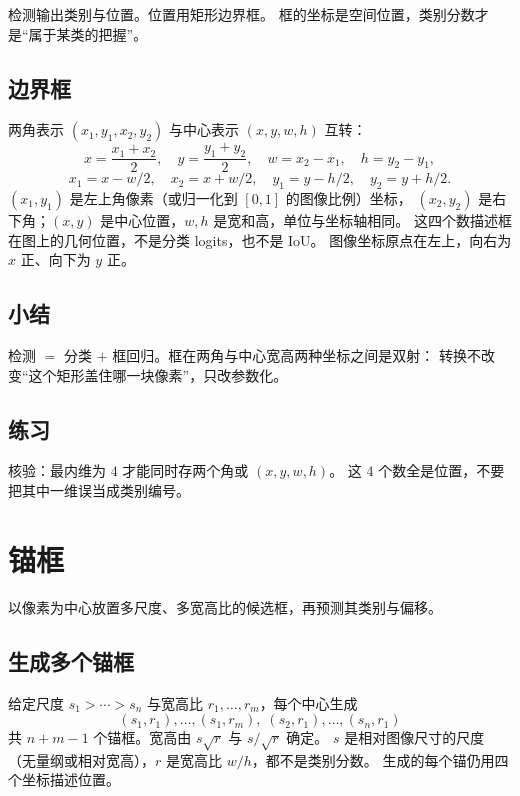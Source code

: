 检测输出类别与位置。位置用矩形边界框。
框的坐标是空间位置，类别分数才是“属于某类的把握”。

\subsection{边界框}

两角表示 $(x_1,y_1,x_2,y_2)$ 与中心表示 $(x,y,w,h)$ 互转：
\[
x=\frac{x_1+x_2}{2},\quad
y=\frac{y_1+y_2}{2},\quad
w=x_2-x_1,\quad
h=y_2-y_1,
\]
\[
x_1=x-w/2,\quad
x_2=x+w/2,\quad
y_1=y-h/2,\quad
y_2=y+h/2.
\]
$(x_1,y_1)$ 是左上角像素（或归一化到 $[0,1]$ 的图像比例）坐标，
$(x_2,y_2)$ 是右下角；$(x,y)$ 是中心位置，$w,h$ 是宽和高，单位与坐标轴相同。
这四个数描述框在图上的几何位置，不是分类 logits，也不是 IoU。
图像坐标原点在左上，向右为 $x$ 正、向下为 $y$ 正。

\subsection{小结}

检测 $=$ 分类 $+$ 框回归。框在两角与中心宽高两种坐标之间是双射：
转换不改变“这个矩形盖住哪一块像素”，只改参数化。

\subsection{练习}

核验：最内维为 $4$ 才能同时存两个角或 $(x,y,w,h)$。
这 $4$ 个数全是位置，不要把其中一维误当成类别编号。

\section{锚框}




以像素为中心放置多尺度、多宽高比的候选框，再预测其类别与偏移。

\subsection{生成多个锚框}

给定尺度 $s_1>\cdots>s_n$ 与宽高比 $r_1,\ldots,r_m$，每个中心生成
\[
(s_1,r_1),\ldots,(s_1,r_m),\;(s_2,r_1),\ldots,(s_n,r_1)
\]
共 $n+m-1$ 个锚框。宽高由 $s\sqrt{r}$ 与 $s/\sqrt{r}$ 确定。
$s$ 是相对图像尺寸的尺度（无量纲或相对宽高），$r$ 是宽高比 $w/h$，都不是类别分数。
生成的每个锚仍用四个坐标描述位置。

